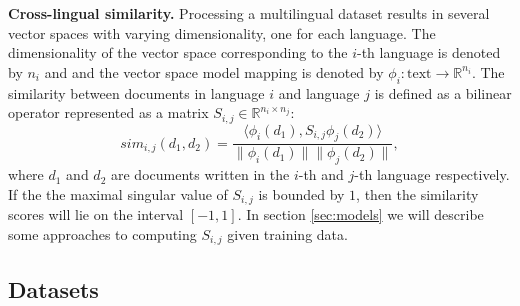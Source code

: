 \documentclass[twoside,11pt]{article}
\newcommand{\RR}{\mathbb{R}}
\begin{document}
\textbf {Cross-lingual similarity.}
Processing a multilingual dataset results in several vector spaces with varying dimensionality, one for each language. The dimensionality of the vector space corresponding to the $i$-th language is denoted by $n_i$ and and the vector space model mapping is denoted by $\phi_i : \text{text} \rightarrow \RR^{n_i}$.
The similarity between documents in language $i$ and language $j$ is defined as a bilinear operator represented as a matrix $S_{i,j} \in \RR^{n_i \times n_j}$:
$$sim_{i,j}(d_1, d_2) = \frac{ \langle \phi_i (d_1), S_{i,j} \phi_j (d_2) \rangle }{\|\phi_i(d_1)\| \|\phi_j(d_2)\|},$$
where $d_1$ and $d_2$ are documents written in the $i$-th and $j$-th language respectively. If the the maximal singular value of $S_{i,j}$ is bounded by $1$, then the similarity scores will lie on the interval $[-1, 1]$. In section \ref{sec:models} we will describe some approaches to computing $S_{i,j}$ given training data.


\subsection{Datasets}
\end{document}
